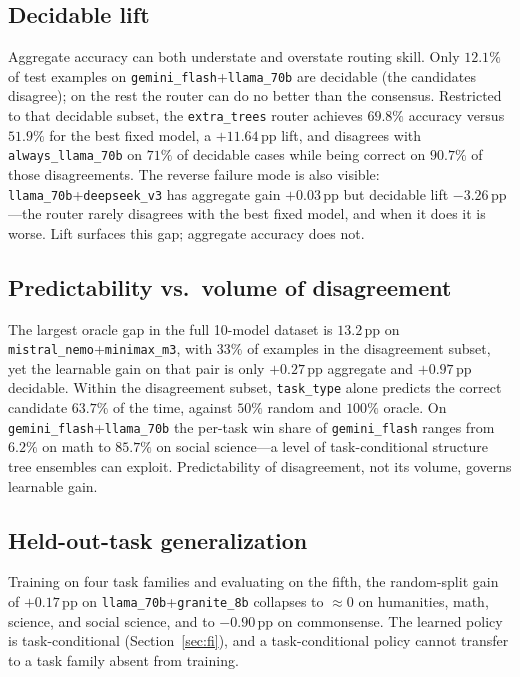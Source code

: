 \documentclass[11pt]{article}
\begin{document}
\subsection{Decidable lift}
\label{sec:lift}
Aggregate accuracy can both understate and overstate routing skill. Only $12.1\%$ of test examples on \texttt{gemini\_flash}+\texttt{llama\_70b} are decidable (the candidates disagree); on the rest the router can do no better than the consensus. Restricted to that decidable subset, the \texttt{extra\_trees} router achieves $69.8\%$ accuracy versus $51.9\%$ for the best fixed model, a $+11.64$\,pp lift, and disagrees with \texttt{always\_llama\_70b} on $71\%$ of decidable cases while being correct on $90.7\%$ of those disagreements. The reverse failure mode is also visible: \texttt{llama\_70b}+\texttt{deepseek\_v3} has aggregate gain $+0.03$\,pp but decidable lift $-3.26$\,pp---the router rarely disagrees with the best fixed model, and when it does it is worse. Lift surfaces this gap; aggregate accuracy does not.

\subsection{Predictability vs.\ volume of disagreement}
\label{sec:weak}
The largest oracle gap in the full 10-model dataset is $13.2$\,pp on \texttt{mistral\_nemo}+\texttt{minimax\_m3}, with $33\%$ of examples in the disagreement subset, yet the learnable gain on that pair is only $+0.27$\,pp aggregate and $+0.97$\,pp decidable. Within the disagreement subset, \texttt{task\_type} alone predicts the correct candidate $63.7\%$ of the time, against $50\%$ random and $100\%$ oracle. On \texttt{gemini\_flash}+\texttt{llama\_70b} the per-task win share of \texttt{gemini\_flash} ranges from $6.2\%$ on math to $85.7\%$ on social science---a level of task-conditional structure tree ensembles can exploit. Predictability of disagreement, not its volume, governs learnable gain.

\subsection{Held-out-task generalization}
Training on four task families and evaluating on the fifth, the random-split gain of $+0.17$\,pp on \texttt{llama\_70b}+\texttt{granite\_8b} collapses to $\approx 0$ on humanities, math, science, and social science, and to $-0.90$\,pp on commonsense. The learned policy is task-conditional (Section~\ref{sec:fi}), and a task-conditional policy cannot transfer to a task family absent from training.
\end{document}
